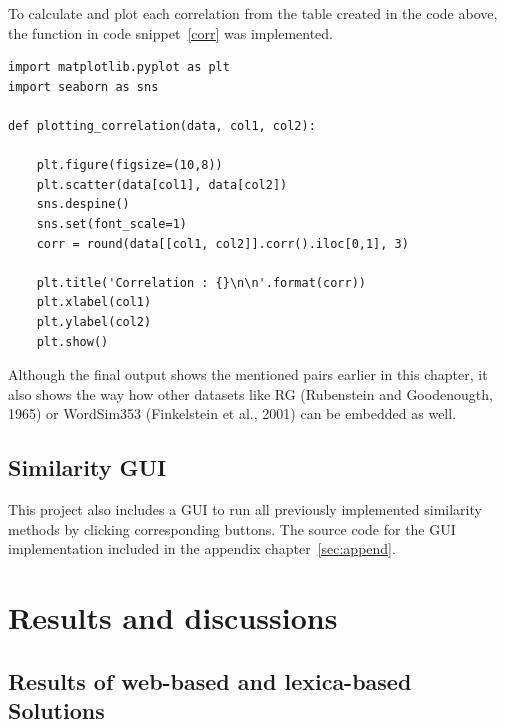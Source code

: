\documentclass[conference]{IEEEtran}
\begin{document}
To calculate and plot each correlation from the table created in the code above, the function in code snippet~\ref{corr} was implemented. 

\begin{lstlisting}[frame=single, label=lst:corr, caption={Correlation calculation function}, captionpos=b]
import matplotlib.pyplot as plt
import seaborn as sns

def plotting_correlation(data, col1, col2):
    
    plt.figure(figsize=(10,8))
    plt.scatter(data[col1], data[col2])
    sns.despine()
    sns.set(font_scale=1)
    corr = round(data[[col1, col2]].corr().iloc[0,1], 3)

    plt.title('Correlation : {}\n\n'.format(corr))
    plt.xlabel(col1)
    plt.ylabel(col2)
    plt.show()
\end{lstlisting}

Although the final output shows the mentioned pairs earlier in this chapter, it also shows the way how other datasets like RG (Rubenstein and Goodenougth, 1965) or WordSim353 (Finkelstein et al., 2001) can be embedded as well. 

\subsection{Similarity GUI}\label{subsec:gui}

This project also includes a GUI to run all previously implemented similarity methods by clicking corresponding buttons. The source code for the GUI implementation included in the appendix chapter~\ref{sec:append}.

\section{Results and discussions}\label{sec:results}

\subsection{Results of web-based and lexica-based Solutions}
\end{document}
